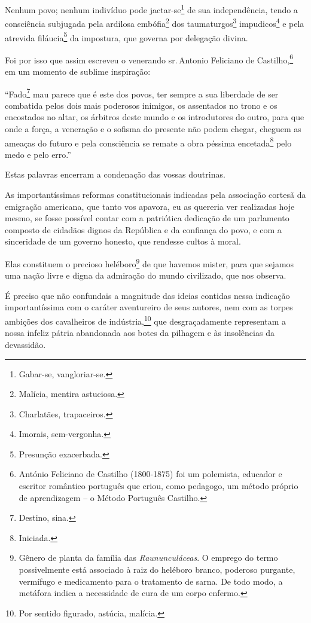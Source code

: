 Nenhum povo; nenhum indivíduo pode jactar-se\footnote{Gabar-se,
  vangloriar-se.} de sua independência, tendo a consciência subjugada
pela ardilosa embófia\footnote{Malícia, mentira astuciosa.} dos
taumaturgos\footnote{Charlatães, trapaceiros.} impudicos\footnote{
  Imorais, sem-vergonha.} e pela atrevida filáucia\footnote{Presunção
  exacerbada.} da impostura, que governa por delegação divina.

Foi por isso que assim escreveu o venerando sr.\,Antonio Feliciano de
Castilho,\footnote{António Feliciano de Castilho (1800-1875) foi um
  polemista, educador e escritor romântico português que criou, como
  pedagogo, um método próprio de aprendizagem -- o Método Português
  Castilho.} em um momento de sublime inspiração:

``Fado\footnote{Destino, sina.} mau parece que é este dos povos, ter
sempre a sua liberdade de ser combatida pelos dois mais poderosos
inimigos, os assentados no trono e os encostados no altar, os árbitros
deste mundo e os introdutores do outro, para que onde a força, a
veneração e o sofisma do presente não podem chegar, cheguem as ameaças
do futuro e pela consciência se remate a obra péssima
encetada\footnote{Iniciada.} pelo medo e pelo erro.''

Estas palavras encerram a condenação das vossas doutrinas.

As importantíssimas reformas constitucionais indicadas pela associação
cortesã da emigração americana, que tanto vos apavora, eu as quereria
ver realizadas hoje mesmo, se fosse possível contar com a patriótica
dedicação de um parlamento composto de cidadãos dignos da República e da
confiança do povo, e com a sinceridade de um governo honesto, que
rendesse cultos à moral.

Elas constituem o precioso heléboro\footnote{Gênero de planta da
  família das \emph{Raununculáceas}. O emprego do termo possivelmente
  está associado à raiz do heléboro branco, poderoso purgante, vermífugo
  e medicamento para o tratamento de sarna. De todo modo, a metáfora
  indica a necessidade de cura de um corpo enfermo.} de que havemos
mister, para que sejamos uma nação livre e digna da admiração do mundo
civilizado, que nos observa.

É preciso que não confundais a magnitude das ideias contidas nessa
indicação importantíssima com o caráter aventureiro de seus autores, nem
com as torpes ambições dos cavalheiros de indústria,\footnote{Por
  sentido figurado, astúcia, malícia.} que desgraçadamente representam
a nossa infeliz pátria abandonada aos botes da pilhagem e às insolências
da devassidão.

